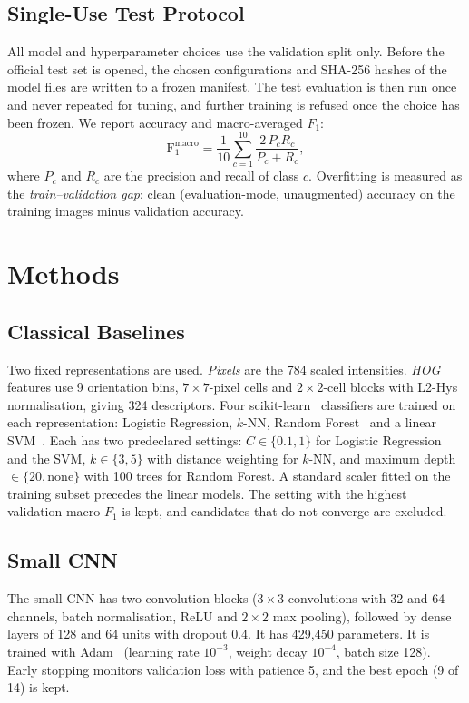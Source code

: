 \documentclass[conference]{IEEEtran}
\begin{document}
\subsection{Single-Use Test Protocol}
All model and hyperparameter choices use the validation split only. Before the official test set is opened, the chosen configurations and SHA-256 hashes of the model files are written to a frozen manifest. The test evaluation is then run once and never repeated for tuning, and further training is refused once the choice has been frozen. We report accuracy and macro-averaged $F_1$:
\begin{equation}
\mathrm{F_1^{macro}} = \frac{1}{10}\sum_{c=1}^{10}\frac{2\,P_c R_c}{P_c + R_c},
\end{equation}
where $P_c$ and $R_c$ are the precision and recall of class $c$. Overfitting is measured as the \emph{train--validation gap}: clean (evaluation-mode, unaugmented) accuracy on the training images minus validation accuracy.

\section{Methods}
\subsection{Classical Baselines}
Two fixed representations are used. \emph{Pixels} are the 784 scaled intensities. \emph{HOG}~\cite{dalal2005hog} features use 9 orientation bins, $7\times7$-pixel cells and $2\times2$-cell blocks with L2-Hys normalisation, giving 324 descriptors. Four scikit-learn~\cite{pedregosa2011scikit} classifiers are trained on each representation: Logistic Regression, $k$-NN, Random Forest~\cite{breiman2001random} and a linear SVM~\cite{cortes1995support}. Each has two predeclared settings: $C\in\{0.1,1\}$ for Logistic Regression and the SVM, $k\in\{3,5\}$ with distance weighting for $k$-NN, and maximum depth $\in\{20,\text{none}\}$ with 100 trees for Random Forest. A standard scaler fitted on the training subset precedes the linear models. The setting with the highest validation macro-$F_1$ is kept, and candidates that do not converge are excluded.

\subsection{Small CNN}
The small CNN has two convolution blocks ($3\times3$ convolutions with 32 and 64 channels, batch normalisation, ReLU and $2\times2$ max pooling), followed by dense layers of 128 and 64 units with dropout 0.4. It has 429,450 parameters. It is trained with Adam~\cite{kingma2015adam} (learning rate $10^{-3}$, weight decay $10^{-4}$, batch size 128). Early stopping monitors validation loss with patience 5, and the best epoch (9 of 14) is kept.
\end{document}
